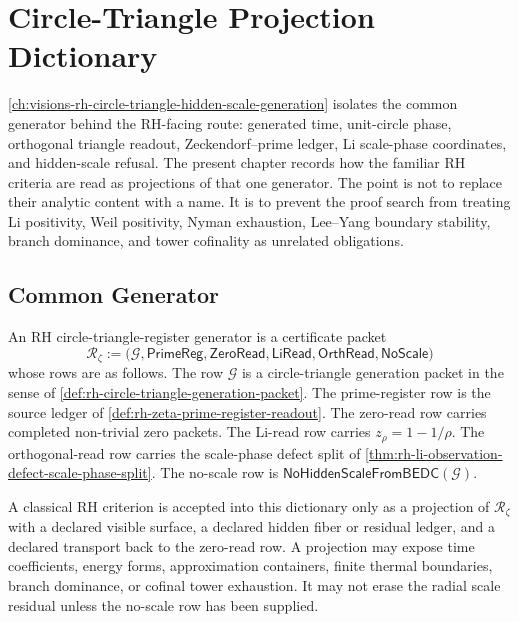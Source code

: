 \chapter{Circle-Triangle Projection Dictionary}
\label{ch:visions-rh-circle-triangle-projection-dictionary}

\autoref{ch:visions-rh-circle-triangle-hidden-scale-generation} isolates
the common generator behind the RH-facing route: generated time,
unit-circle phase, orthogonal triangle readout, Zeckendorf--prime ledger,
Li scale-phase coordinates, and hidden-scale refusal. The present chapter
records how the familiar RH criteria are read as projections of that one
generator. The point is not to replace their analytic content with a
name. It is to prevent the proof search from treating Li positivity,
Weil positivity, Nyman exhaustion, Lee--Yang boundary stability, branch
dominance, and tower cofinality as unrelated obligations.

\section{Common Generator}
\label{sec:rh-circle-triangle-projection-common-generator}

\begin{definition}
\label{def:rh-circle-triangle-register-generator}
An RH circle-triangle-register generator is a certificate packet
$$
\mathcal R_{\zeta}
:=
\bigl(
\mathcal G,
\mathsf{PrimeReg},
\mathsf{ZeroRead},
\mathsf{LiRead},
\mathsf{OrthRead},
\mathsf{NoScale}
\bigr)
$$
whose rows are as follows. The row $\mathcal G$ is a
circle-triangle generation packet in the sense of
\autoref{def:rh-circle-triangle-generation-packet}. The prime-register
row is the source ledger of
\autoref{def:rh-zeta-prime-register-readout}. The zero-read row carries
completed non-trivial zero packets. The Li-read row carries
$z_{\rho}=1-1/\rho$. The orthogonal-read row carries the scale-phase
defect split of
\autoref{thm:rh-li-observation-defect-scale-phase-split}. The no-scale
row is $\mathsf{NoHiddenScaleFromBEDC}(\mathcal G)$.
\end{definition}

\begin{principle}
\label{prin:rh-projection-discipline-for-criteria}
A classical RH criterion is accepted into this dictionary only as a
projection of $\mathcal R_{\zeta}$ with a declared visible surface, a
declared hidden fiber or residual ledger, and a declared transport back
to the zero-read row. A projection may expose time coefficients, energy
forms, approximation containers, finite thermal boundaries, branch
dominance, or cofinal tower exhaustion. It may not erase the radial scale
residual unless the no-scale row has been supplied.
\end{principle}

